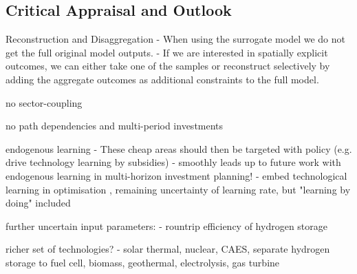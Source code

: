 \subsection{Critical Appraisal and Outlook}

Reconstruction and Disaggregation
- When using the surrogate model we do not get the full original model outputs.
- If we are interested in spatially explicit outcomes, we can either take one of the samples
or reconstruct selectively by adding the aggregate outcomes as additional constraints to the full model.

no sector-coupling

no path dependencies and multi-period investments

endogenous learning
- These cheap areas should then be targeted with policy (e.g. drive technology learning by subsidies)
- smoothly leads up to future work with endogenous learning in multi-horizon investment planning!
- embed technological learning in optimisation \cite{heuberger_power_2017} \cite{lopion_cost_2019}, remaining uncertainty of learning rate, but "learning by doing" included

further uncertain input parameters:
- rountrip efficiency of hydrogen storage

richer set of technologies?
- solar thermal, nuclear, CAES, separate hydrogen storage to fuel cell, biomass, geothermal, electrolysis, gas turbine
